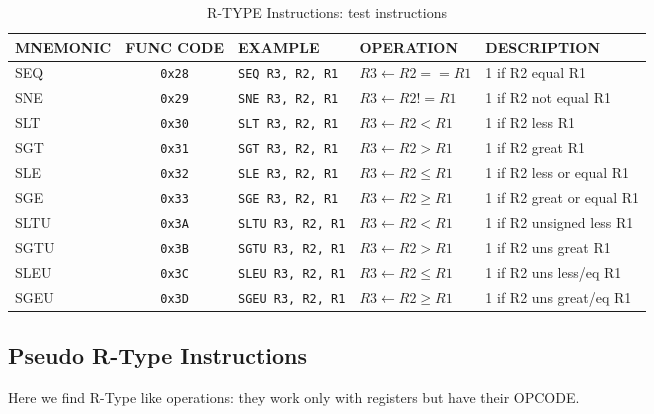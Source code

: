 \begin{table}[H]
\begin{tabularx}{\textwidth}{|l|c|l|l|X|}
    \hline
    MNEMONIC & FUNC CODE & EXAMPLE & OPERATION & DESCRIPTION \\ 
    \hline
    SEQ & \texttt{0x28} & \texttt{SEQ R3, R2, R1} & $R3 \leftarrow R2 == R1$ & 1 if R2 equal R1\\ 
    \hline
    SNE & \texttt{0x29} & \texttt{SNE R3, R2, R1} & $R3 \leftarrow R2 != R1$ & 1 if R2 not equal R1\\ 
    \hline
    SLT & \texttt{0x30} & \texttt{SLT R3, R2, R1} & $R3 \leftarrow R2 < R1$ & 1 if R2 less R1\\ 
    \hline
    SGT & \texttt{0x31} & \texttt{SGT R3, R2, R1} & $R3 \leftarrow R2 > R1$ & 1 if R2 great R1\\ 
    \hline
    SLE & \texttt{0x32} & \texttt{SLE R3, R2, R1} & $R3 \leftarrow R2 \leq R1$ & 1 if R2 less or equal R1\\ 
    \hline
    SGE & \texttt{0x33} & \texttt{SGE R3, R2, R1} & $R3 \leftarrow R2 \geq R1$ & 1 if R2 great or equal R1\\ 
    \hline
    SLTU & \texttt{0x3A} & \texttt{SLTU R3, R2, R1} & $R3 \leftarrow R2 < R1$ & 1 if R2 unsigned less R1\\ 
    \hline
    SGTU & \texttt{0x3B} & \texttt{SGTU R3, R2, R1} & $R3 \leftarrow R2 > R1$ & 1 if R2 uns great R1\\ 
    \hline
    SLEU & \texttt{0x3C} & \texttt{SLEU R3, R2, R1} & $R3 \leftarrow R2 \leq R1$ & 1 if R2 uns less/eq R1\\ 
    \hline
    SGEU & \texttt{0x3D} & \texttt{SGEU R3, R2, R1} & $R3 \leftarrow R2 \geq R1$ & 1 if R2 uns great/eq R1\\ 
    \hline
\end{tabularx}
\caption{R-TYPE Instructions: test instructions}
\label{table:r_type_test}
\end{table}

\subsection{Pseudo R-Type Instructions}

Here we find R-Type like operations: they work only with registers but have their OPCODE.

